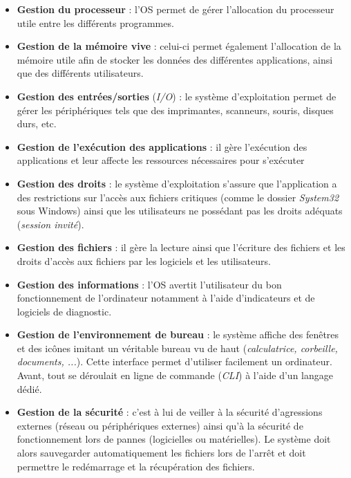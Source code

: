 \begin{itemize}
\item \textbf{Gestion du processeur} : l'OS permet de gérer l'allocation du
processeur utile entre les différents programmes. \\

\item \textbf{Gestion de la mémoire vive} : celui-ci permet également
l'allocation de la mémoire utile afin de stocker les données des différentes
applications, ainsi que des différents utilisateurs. \\

\item \textbf{Gestion des entrées/sorties} (\textit{I/O}) : le système
d'exploitation permet de gérer les périphériques tels que des imprimantes,
scanneurs, souris, disques durs, etc. \\

\item \textbf{Gestion de l'exécution des applications} : il gère l'exécution
des applications et leur affecte les ressources nécessaires pour s'exécuter \\

\item \textbf{Gestion des droits} : le système d'exploitation s'assure que
l'application a des restrictions sur l'accès aux fichiers critiques (comme le
dossier \textit{System32} sous Windows) ainsi que les utilisateurs ne possédant
pas les droits adéquats (\textit{session invité}). \\

\item \textbf{Gestion des fichiers} : il gère la lecture ainsi que l'écriture
des fichiers et les droits d'accès aux fichiers par les logiciels et les
utilisateurs. \\

\item \textbf{Gestion des informations} : l'OS avertit l'utilisateur du bon
fonctionnement de l'ordinateur notamment à l'aide d'indicateurs et de logiciels
de diagnostic. \\

\item \textbf{Gestion de l'environnement de bureau} : le système affiche des
fenêtres et des icônes imitant un véritable bureau vu de haut
(\textit{calculatrice, corbeille, documents, ...}). Cette interface permet
d'utiliser facilement un ordinateur. Avant, tout se déroulait en ligne de
commande (\textit{CLI}) à l'aide d'un langage dédié. \\

\item \textbf{Gestion de la sécurité} : c'est à lui de veiller à la sécurité
d'agressions externes (réseau ou périphériques externes) ainsi qu'à la sécurité
de fonctionnement lors de pannes (logicielles ou matérielles). Le système doit
alors sauvegarder automatiquement les fichiers lors de l'arrêt et doit
permettre le redémarrage et la récupération des fichiers.
\end{itemize}

